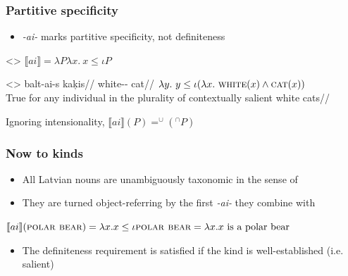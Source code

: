 \documentclass[9pt, t]{beamer}
\begin{document}
\begin{frame}[c]
    \frametitle{Partitive specificity}

    \begin{itemize}
        \item \textit{-ai-} marks partitive specificity, not definiteness
    \end{itemize}

    \ex<>
        $\llbracket ai \rrbracket = \lambda P\lambda x.\ x\le \iota P$
    \xe

    \pause
    
    \ex<>
        \begingl
            \gla balt-ai-s kaķis//
            \glb white-\Def-\Nom{} cat//
            \glft $\lambda y.\ y\le\iota(\lambda x.\ \textsc{white}(x) \land \textsc{cat}(x))$\\
            True for any individual in the plurality of contextually salient white cats//
        \endgl
    \xe

    Ignoring intensionality, $\llbracket ai \rrbracket (P) = ^{\cup}(^{\cap} P)$


\end{frame}

\begin{frame}
    \frametitle{Now to kinds}

    \begin{itemize}
        \item All Latvian nouns are unambiguously taxonomic in the sense of \citep{dayal2004}
        \item They are turned object-referring by the first \textit{-ai-} they combine with        
    \end{itemize}
    
    \ex 
        $\llbracket ai \rrbracket (\textsc{polar bear}) = \lambda x. x\le \iota \textsc{polar bear} = \lambda x. x\text{ is a polar bear}$
    \xe

    \begin{itemize}
        \item The definiteness requirement is satisfied if the kind is well-established (i.e. salient)
    \end{itemize}
    

\end{frame}
\end{document}
